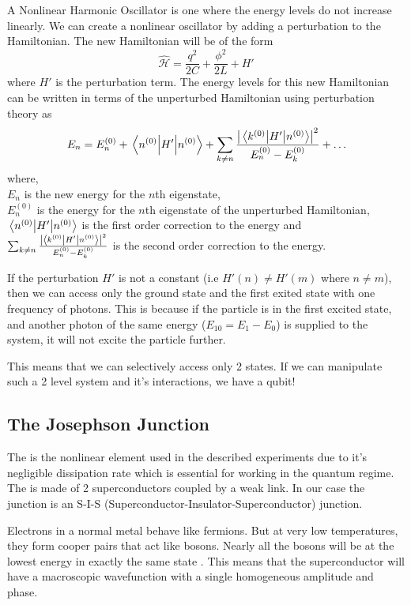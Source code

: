 A Nonlinear Harmonic Oscillator is one where the energy levels do not increase linearly. We can create a nonlinear oscillator by adding a perturbation to the Hamiltonian. The new Hamiltonian will be of the form
\begin{equation}
\hat{\mathcal{H}}=\frac{q^2}{2C}+\frac{\phi^2}{2L} +H'
\end{equation}
where $H'$ is the perturbation term.
The energy levels for this new Hamiltonian can be written in terms of the unperturbed Hamiltonian using perturbation theory as
\begin{equation}
E_n=E_n^{(0)}+\expval{H'}{n^{(0)}}+\sum_{k\neq n}\frac{\left|\mel{k^{(0)}}{H'}{n^{(0)}}\right|^2}{E_n^{(0)}-E_k^{(0)}}+\ldots
\end{equation}
where,\\
$E_n$ is the new energy for the $n$th eigenstate,\\
$E_n^{(0)}$ is the energy for the $n$th eigenstate of the unperturbed Hamiltonian,\\
$\expval{H'}{n^{(0)}}$ is the first order correction to the energy and\\
$\sum_{k\neq n}\frac{\left|\mel{k^{(0)}}{H'}{n^{(0)}}\right|^2}{E_n^{(0)}-E_k^{(0)}}$ is the second order correction to the energy.

If the perturbation $H'$ is not a constant (i.e $H'(n)\neq H'(m)$ where $n\neq m$), then we can access only the ground state and the first exited state with one frequency of photons. This is because if the particle is in the first excited state, and another photon of the same energy ($E_{10}=E_1-E_0$) is supplied to the system, it will not excite the particle further.

This means that we can selectively access only 2 states. If we can manipulate such a 2 level system and it's interactions, we have a qubit!

\subsection{The Josephson Junction}

The \JJ is the nonlinear element used in the described experiments due to it's negligible dissipation rate which is essential for working in the quantum regime.\\
The \JJ is made of 2 superconductors coupled by a weak link. In our case the junction is an S-I-S (Superconductor-Insulator-Superconductor) junction.

Electrons in a normal metal behave like fermions. But at very low temperatures, they form cooper pairs that act like bosons. Nearly all the bosons will be at the lowest energy in exactly the same state \cite{Feynman1966}. This means that the superconductor will have a macroscopic wavefunction with a single homogeneous amplitude and phase.

